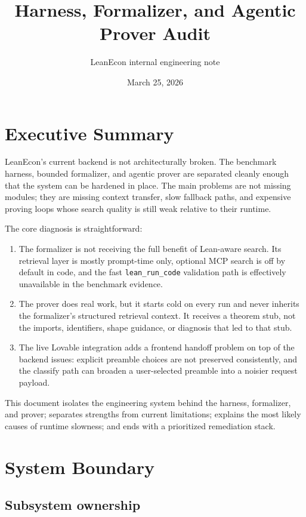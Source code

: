\documentclass[11pt]{article}
\title{Harness, Formalizer, and Agentic Prover Audit}
\author{LeanEcon internal engineering note}
\date{March 25, 2026}
\begin{document}
\maketitle

\section*{Executive Summary}

LeanEcon's current backend is not architecturally broken. The benchmark harness,
bounded formalizer, and agentic prover are separated cleanly enough that the
system can be hardened in place. The main problems are not missing modules;
they are missing context transfer, slow fallback paths, and expensive proving
loops whose search quality is still weak relative to their runtime.

The core diagnosis is straightforward:

\begin{enumerate}[leftmargin=1.5em]
  \item The formalizer is not receiving the full benefit of Lean-aware search.
  Its retrieval layer is mostly prompt-time only, optional MCP search is off by
  default in code, and the fast \texttt{lean\_run\_code} validation path is
  effectively unavailable in the benchmark evidence.
  \item The prover does real work, but it starts cold on every run and never
  inherits the formalizer's structured retrieval context. It receives a theorem
  stub, not the imports, identifiers, shape guidance, or diagnosis that led to
  that stub.
  \item The live Lovable integration adds a frontend handoff problem on top of
  the backend issues: explicit preamble choices are not preserved consistently,
  and the classify path can broaden a user-selected preamble into a noisier
  request payload.
\end{enumerate}

This document isolates the engineering system behind the harness, formalizer,
and prover; separates strengths from current limitations; explains the most
likely causes of runtime slowness; and ends with a prioritized remediation
stack.

\section{System Boundary}

\subsection*{Subsystem ownership}
\end{document}
